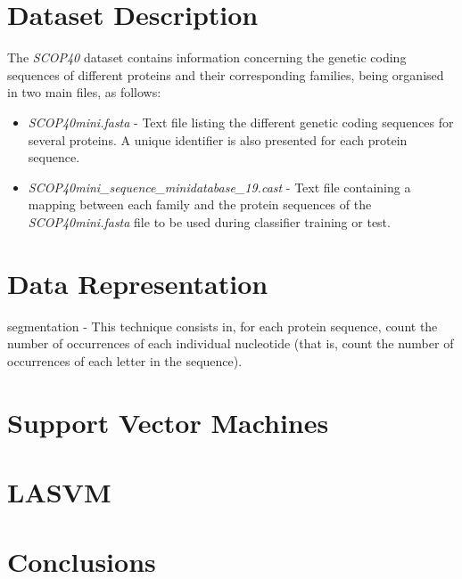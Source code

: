 \documentclass[11pt]{article}
\begin{document}
\section{Dataset Description}
\label{dataset_description}

The \emph{SCOP40} dataset contains information concerning the genetic coding sequences of different proteins and their corresponding families, being organised in two main files, as follows:

\begin{itemize}
	\item \emph{SCOP40mini.fasta} - Text file listing the different genetic coding sequences for several proteins. A unique identifier is also presented for each protein sequence.
	
	\item \emph{SCOP40mini\_sequence\_minidatabase\_19.cast} - Text file containing a mapping between each family and the protein sequences of the \emph{SCOP40mini.fasta} file to be used during classifier training or test.
\end{itemize}

\section{Data Representation}
\label{data_representation}

segmentation - This technique consists in, for each protein sequence, count the number of occurrences of each individual nucleotide (that is, count the number of occurrences of each letter in the sequence).

\section{Support Vector Machines}
\label{svm}

\section{LASVM}
\label{lasvm}

\section{Conclusions}
\label{conclusions}



\end{document}

